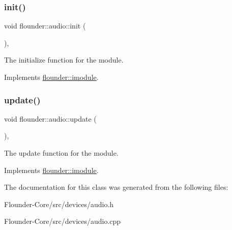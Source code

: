 \subsubsection{\texorpdfstring{init()}{init()}}
{\footnotesize\ttfamily void flounder\+::audio\+::init (\begin{DoxyParamCaption}{ }\end{DoxyParamCaption})\hspace{0.3cm}{\ttfamily [override]}, {\ttfamily [virtual]}}



The initialize function for the module. 



Implements \hyperlink{classflounder_1_1imodule_a1725ef346952884d0741de61aba1e0c7}{flounder\+::imodule}.

\mbox{\label{classflounder_1_1audio_aabff6a1996b8571404023b6ac17009b6}} 
\subsubsection{\texorpdfstring{update()}{update()}}
{\footnotesize\ttfamily void flounder\+::audio\+::update (\begin{DoxyParamCaption}{ }\end{DoxyParamCaption})\hspace{0.3cm}{\ttfamily [override]}, {\ttfamily [virtual]}}



The update function for the module. 



Implements \hyperlink{classflounder_1_1imodule_a9a53d48a46b5f6b16a92b2cd8503f74a}{flounder\+::imodule}.



The documentation for this class was generated from the following files\+:\begin{DoxyCompactItemize}
\item 
Flounder-\/\+Core/src/devices/audio.\+h\item 
Flounder-\/\+Core/src/devices/audio.\+cpp\end{DoxyCompactItemize}
